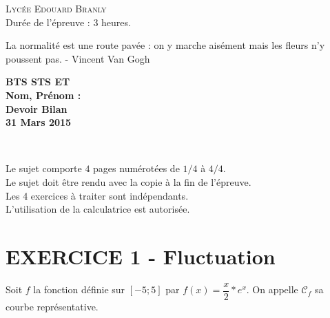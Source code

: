 \documentclass[12pt]{article}
\begin{document}
\setlength{\columnseprule}{0pt}

  \textsc{\LARGE Lycée Edouard Branly}\\[1.0cm] %
  {\huge Durée de l'épreuve : 3 heures.}\\[0.5cm]

\noindent\hrulefill

\begin{center}
  \textsf{La normalité est une route pavée : on y marche aisément mais les fleurs n'y poussent pas. - Vincent Van Gogh}\\
\end{center}

\noindent\hrulefill

\begin{minipage}[t]{\textwidth}
  \raggedright
      {\bfseries BTS STS ET}\\
      {\bfseries Nom, Prénom : }\\[.35ex]
      \vspace*{-1cm}
      \raggedleft
          {\bfseries Devoir Bilan}\\[.35ex]
          {\bfseries 31 Mars 2015}\\[.35ex]
\end{minipage}\\[1em]

\noindent\hrulefill

\noindent\hrulefill

  \begin{minipage}{\textwidth}
    \begin{flushright} 
      Le sujet comporte $4$  pages numérotées de   $1/4$   à  $4/4$.\\
      Le sujet doit être rendu avec la copie à la fin de l’épreuve.\\
      Les 4 exercices à traiter sont indépendants.\\
      L'utilisation de la calculatrice est autorisée.\\
    \end{flushright}
  \end{minipage}


\section*{EXERCICE 1 - Fluctuation}



Soit $f$ la fonction définie sur $[-5 ; 5]$ par $f(x) = \dfrac{x}{2} * e^x$. On appelle $\mathcal{C}_f$ sa courbe représentative.
\end{document}

